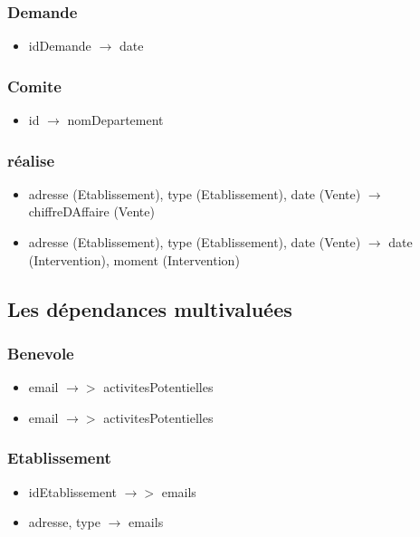 \subsubsection*{Demande}
\begin{itemize}
\item[] idDemande $\rightarrow$ date
\end{itemize}

\subsubsection*{Comite}
\begin{itemize}
\item[] id $\rightarrow$ nomDepartement
\end{itemize}

 
\subsubsection*{réalise}
\begin{itemize}
\item[] adresse (Etablissement), type (Etablissement), date (Vente) $\rightarrow$ chiffreDAffaire (Vente)
\item[] adresse (Etablissement), type (Etablissement), date (Vente) $\rightarrow$ date (Intervention), moment (Intervention)
\end{itemize}

\subsection{Les dépendances multivaluées}

\subsubsection*{Benevole}
\begin{itemize}
\item[] email $\rightarrow > $ activitesPotentielles 
\item[]email $\rightarrow >$ activitesPotentielles 
\end{itemize}


\subsubsection*{Etablissement}
\begin{itemize}
\item[] idEtablissement $\rightarrow >$ emails
\item[] adresse, type $\rightarrow$ emails
\end{itemize}

